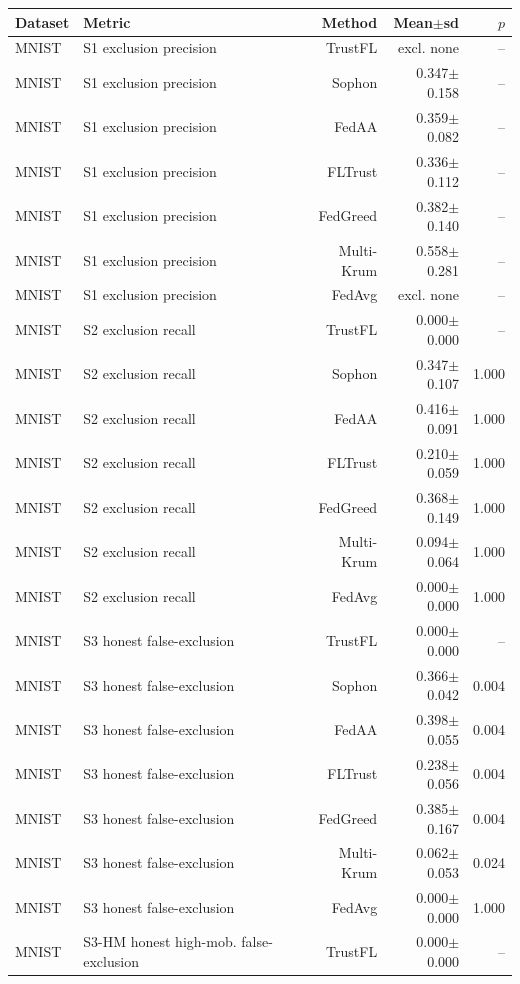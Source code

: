 \begin{tabular}{llrrr}
\toprule
Dataset & Metric & Method & Mean$\pm$sd & $p$ \\
\midrule
MNIST & S1 exclusion precision & TrustFL & excl. none & -- \\
MNIST & S1 exclusion precision & Sophon & 0.347$\pm$0.158 & -- \\
MNIST & S1 exclusion precision & FedAA & 0.359$\pm$0.082 & -- \\
MNIST & S1 exclusion precision & FLTrust & 0.336$\pm$0.112 & -- \\
MNIST & S1 exclusion precision & FedGreed & 0.382$\pm$0.140 & -- \\
MNIST & S1 exclusion precision & Multi-Krum & 0.558$\pm$0.281 & -- \\
MNIST & S1 exclusion precision & FedAvg & excl. none & -- \\
MNIST & S2 exclusion recall & TrustFL & 0.000$\pm$0.000 & -- \\
MNIST & S2 exclusion recall & Sophon & 0.347$\pm$0.107 & 1.000 \\
MNIST & S2 exclusion recall & FedAA & 0.416$\pm$0.091 & 1.000 \\
MNIST & S2 exclusion recall & FLTrust & 0.210$\pm$0.059 & 1.000 \\
MNIST & S2 exclusion recall & FedGreed & 0.368$\pm$0.149 & 1.000 \\
MNIST & S2 exclusion recall & Multi-Krum & 0.094$\pm$0.064 & 1.000 \\
MNIST & S2 exclusion recall & FedAvg & 0.000$\pm$0.000 & 1.000 \\
MNIST & S3 honest false-exclusion & TrustFL & 0.000$\pm$0.000 & -- \\
MNIST & S3 honest false-exclusion & Sophon & 0.366$\pm$0.042 & 0.004 \\
MNIST & S3 honest false-exclusion & FedAA & 0.398$\pm$0.055 & 0.004 \\
MNIST & S3 honest false-exclusion & FLTrust & 0.238$\pm$0.056 & 0.004 \\
MNIST & S3 honest false-exclusion & FedGreed & 0.385$\pm$0.167 & 0.004 \\
MNIST & S3 honest false-exclusion & Multi-Krum & 0.062$\pm$0.053 & 0.024 \\
MNIST & S3 honest false-exclusion & FedAvg & 0.000$\pm$0.000 & 1.000 \\
MNIST & S3-HM honest high-mob. false-exclusion & TrustFL & 0.000$\pm$0.000 & -- \\

\end{tabular}
